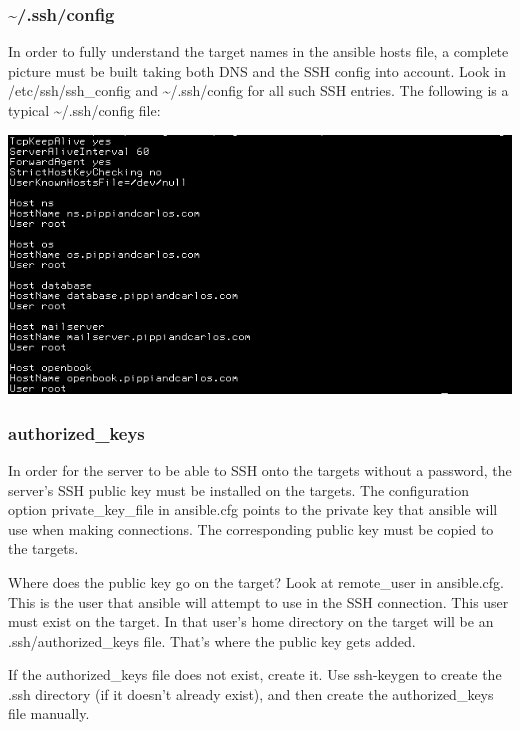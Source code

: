 \documentclass[helvetica,english,utf8,notitle,nologo]{beamer}
\begin{document}
\begin{frame}
  \frametitle{\textasciitilde/.ssh/config}

  In order to fully understand the target names in the ansible hosts
  file, a complete picture must be built taking both DNS and the SSH
  config into account. Look in /etc/ssh/ssh\_config and
  \textasciitilde/.ssh/config for all such SSH entries. The following
  is a typical \textasciitilde/.ssh/config file:

  \includegraphics[scale=0.44]{img_3}
\end{frame}

\begin{frame}
  \frametitle{authorized\_keys}

  In order for the server to be able to SSH onto the targets without a
  password, the server's SSH public key must be installed on the
  targets. The configuration option private\_key\_file in ansible.cfg
  points to the private key that ansible will use when making
  connections. The corresponding public key must be copied to the
  targets.

  Where does the public key go on the target? Look at remote\_user in
  ansible.cfg. This is the user that ansible will attempt to use in
  the SSH connection. This user must exist on the target. In that
  user's home directory on the target will be an .ssh/authorized\_keys
  file. That's where the public key gets added.

  If the authorized\_keys file does not exist, create it. Use
  ssh-keygen to create the .ssh directory (if it doesn't already
  exist), and then create the authorized\_keys file manually.
\end{frame}
\end{document}
